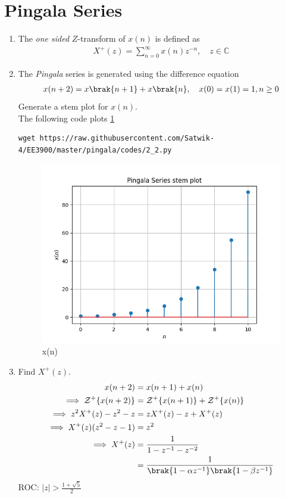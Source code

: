 \documentclass[journal,12pt,twocolumn]{IEEEtran}
\renewcommand\thesection{\arabic{section}}
\begin{document}
\section{Pingala Series}
\begin{enumerate}[label=\thesection.\arabic*,ref=\thesection.\theenumi]
\item The {\em one sided} $Z$-transform of $x(n)$ is defined as 
\begin{align}
	X^{+}(z) = \sum_{n = 0}^{\infty}x(n)z^{-n}, \quad z \in \mathbb{C}
\label{eq:one-Z}
\end{align}
	\item The {\em Pingala} series is generated using the difference equation 
\begin{align}
	x(n+2) = x\brak{n+1} + x\brak{n},  \quad x(0) = x(1) = 1, n \ge 0
	\label{eq:10-pingala}
\end{align}
Generate a stem plot for $x(n)$.\\
\solution The following code plots \ref{fig:xn}
	    \begin{lstlisting}
wget https://raw.githubusercontent.com/Satwik-4/EE3900/master/pingala/codes/2_2.py
\end{lstlisting}
\begin{figure}
    \centering
    \includegraphics[width=\columnwidth]{figures/2_2.png}
    \caption{x(n)}
    \label{fig:xn}
\end{figure}
\item 		Find $X^{+}(z)$.\\
\solution
\begin{align}
    x(n+2)&=x(n+1)+x(n)\\
    \implies \mathcal{Z}^{+}\{x(n+2)\}&=\mathcal{Z}^{+}\{x(n+1)\}+\mathcal{Z}^{+}\{x(n)\}\\
    \implies z^2X^{+}(z)-z^2-z&=zX^{+}(z)-z+X^{+}(z)\\
    \implies X^{+}(z)(z^2-z-1)&=z^2\\
    \implies X^{+}(z) &= \frac{1}{1-z^{-1}-z^{-2}}\\
    &= \frac{1}{\brak{1-\alpha z^{-1}} \brak{1-\beta z^{-1}}}
\end{align}
ROC: $|z|>\frac{1+\sqrt{5}}{2}$


\end{enumerate}
\end{document}
